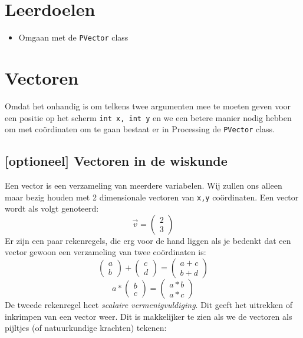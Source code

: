\newcommand{\tttt}{Vectoren}
\newcommand{\dddd}{Datum 1}



\section{Leerdoelen}
\begin{itemize}
	\item Omgaan met de \texttt{PVector} class
\end{itemize}

\section{Vectoren}
Omdat het onhandig is om telkens twee argumenten mee te moeten geven voor een positie op het scherm \texttt{int x, int y} en we een betere manier nodig hebben om met co\"ordinaten om te gaan bestaat er in Processing de \texttt{PVector} class.

\subsection{[optioneel] Vectoren in de wiskunde}
Een vector is een verzameling van meerdere variabelen. Wij zullen ons alleen maar bezig houden met 2 dimensionale vectoren van \texttt{x,y} co\"ordinaten.
Een vector wordt als volgt genoteerd: 
$$
\vec{v}=
\begin{pmatrix}
2\\ 
3
\end{pmatrix}
$$
Er zijn een paar rekenregels, die erg voor de hand liggen als je bedenkt dat een vector gewoon een verzameling van twee co\"ordinaten is:
$$
\begin{pmatrix}
a\\ 
b
\end{pmatrix}
+
\begin{pmatrix}
c\\ 
d
\end{pmatrix}
=
\begin{pmatrix}
a + c\\ 
b + d
\end{pmatrix}
$$
$$
a * 
\begin{pmatrix}
b\\ 
c
\end{pmatrix}
=
\begin{pmatrix}
a*b\\ 
a*c
\end{pmatrix}
$$
De tweede rekenregel heet \textit{scalaire vermenigvuldiging}. Dit geeft het uitrekken of inkrimpen van een vector weer. Dit is makkelijker te zien als we de vectoren als pijltjes (of natuurkundige krachten) tekenen:\\
